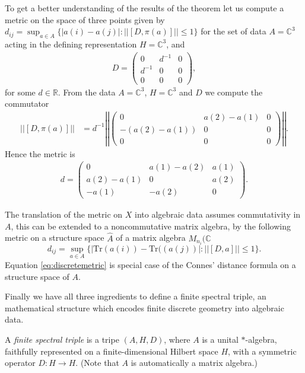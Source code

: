 To get a better understanding of the results of the theorem let us compute a
metric on the space of three points given by $d_{ij} = \sup_{a\in A}\{|a(i) -
a(j)|: ||[D, \pi(a)]|| \leq 1\}$ for the set of data $A = \mathbb{C}^3$ acting
in the defining representation $H = \mathbb{C}^3$, and
\begin{align}
    D =
    \begin{pmatrix}
        0 & d^{-1} & 0 \\ d^{-1} & 0 & 0 \\ 0 & 0 & 0
    \end{pmatrix},
\end{align}
for some $d \in \mathbb{R}$.
From the data $A=\mathbb{C}^3$, $H=\mathbb{C}^3$ and $D$ we compute the
commutator
\begin{align}
    \big|\big|[D, \pi(a)]\big|\big| &= d^{-1}\left|\left|
\begin{pmatrix}
    0 & a(2)-a(1) & 0 \\
    -(a(2)-a(1)) & 0 & 0 \\
    0 & 0 & 0
\end{pmatrix} \right|\right|.
\end{align}
Hence the metric is
\begin{align}
d =
    \begin{pmatrix}
        0 & a(1)-a(2) & a(1)  \\
        a(2)-a(1) & 0 & a(2) \\
        -a(1) & -a(2) & 0
    \end{pmatrix}.
\end{align}

The translation of the metric on $X$ into algebraic data assumes commutativity
in $A$, this can be extended to a noncommutative matrix algebra, by the
following metric on a structure space $\hat{A}$ of a matrix algebra
$M_{n_i}(\mathbb{C}$
\begin{equation}
    d_{ij} = \sup_{a\in A}\big\{|\text{Tr}(a(i)) - \text{Tr}((a(j))|: ||[D,
    a]|| \leq 1\big\}.\label{eq:discretemetric}
\end{equation}
Equation \eqref{eq:discretemetric} is special case of the Connes' distance
formula on a structure space of $A$.

Finally we have all three ingredients to define a finite spectral triple, an
mathematical structure which encodes finite discrete geometry into algebraic data.
\begin{definition}
    A \textit{finite spectral triple} is a tripe $(A, H, D)$, where $A$ is a unital $*$-algebra,
    faithfully represented on a finite-dimensional Hilbert space $H$, with a symmetric operator
    $D: H \rightarrow H$. (Note that $A$ is automatically a matrix algebra.)
\end{definition}

